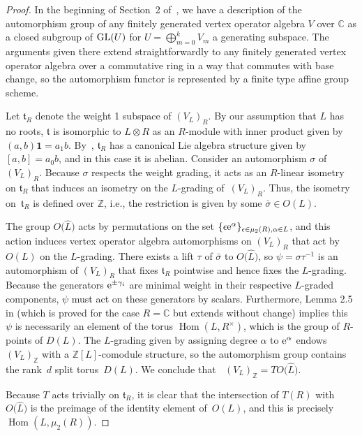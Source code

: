 \documentclass[pdftex]{sigma}
\newcommand{\bC}{\mathbb{C}}
\newcommand{\bZ}{\mathbb{Z}}
\newcommand{\unit}{\mathbf{1}}
\newcommand{\ft}{\mathfrak{t}}
\DeclareMathOperator{\uAut}{\underline{Aut}}
\DeclareMathOperator{\Hom}{Hom}
\theoremstyle{definition}
\begin{document}
\begin{proof}In the beginning of Section~2 of~\cite{DG01}, we have a description of the automorphism group of any finitely generated vertex operator algebra $V$ over $\bC$ as a closed subgroup of ${\rm GL}(U)$ for $U = \bigoplus_{m=0}^k V_m$ a generating subspace. The arguments given there extend straightforwardly to any finitely generated vertex operator algebra over a commutative ring in a way that commutes with base change, so the automorphism functor is represented by a finite type affine group scheme.

Let $\ft_R$ denote the weight 1 subspace of $(V_L)_R$. By our assumption that $L$ has no roots, $\ft$ is isomorphic to $L \otimes R$ as an $R$-module with inner product given by $(a,b)\unit = a_1 b$. By~\cite{B86}, $\ft_R$ has a canonical Lie algebra structure given by $[a,b] = a_0 b$, and in this case it is abelian. Consider an automorphism $\sigma$ of $(V_L)_R$. Because $\sigma$ respects the weight grading, it acts as an $R$-linear isometry on $\ft_R$ that induces an isometry on the $L$-grading of~$(V_L)_R$. Thus, the isometry on~$\ft_R$ is defined over $\bZ$, i.e., the restriction is given by some $\bar{\sigma} \in O(L)$.

The group $O\big(\hat{L}\big)$ acts by permutations on the set $\{ \epsilon {\rm e}^\alpha \}_{\epsilon \in \mu_2(R), \alpha \in L}$, and this action induces vertex operator algebra automorphisms on $(V_L)_R$ that act by $O(L)$ on the $L$-grading. There exists a lift $\tau$ of $\bar{\sigma}$ to $O\big(\hat{L}\big)$, so $\psi = \sigma \tau^{-1}$ is an automorphism of $(V_L)_R$ that fixes $\ft_R$ pointwise and hence fixes the $L$-grading. Because the generators ${\rm e}^{\pm \gamma_i}$ are minimal weight in their respective $L$-graded components, $\psi$ must act on these generators by scalars. Furthermore, Lemma 2.5 in \cite{DN98} (which is proved for the case $R = \bC$ but extends without change) implies this $\psi$ is necessarily an element of the torus $\Hom(L, R^\times)$, which is the group of $R$-points of $D(L)$. The $L$-grading given by assigning degree $\alpha$ to ${\rm e}^\alpha$ endows $(V_L)_\bZ$ with a $\bZ[L]$-comodule structure, so the automorphism group contains the rank~$d$ split torus~$D(L)$. We conclude that $\uAut(V_L)_\bZ = T O\big(\hat{L}\big)$.

Because $T$ acts trivially on $\ft_R$, it is clear that the intersection of $T(R)$ with $O\big(\hat{L}\big)$ is the preimage of the identity element of~$O(L)$, and this is precisely $\Hom(L,\mu_2(R))$.
\end{proof}
\end{document}
